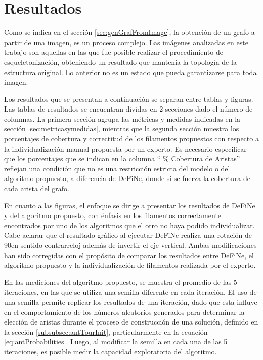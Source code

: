 \chapter{Resultados}
\label{chap:res}

Como se indica en el secci\'on \ref{sec:genGrafFromImage}, la obtenci\'on de un grafo a partir de una imagen, es un proceso complejo. Las im\'agenes analizadas en este trabajo son aquellas en las que fue posible realizar el procedimiento de esqueletonizaci\'on, obteniendo un resultado que manten\'ia la topolog\'ia de la estructura original. Lo anterior no es un estado que pueda garantizarse para toda imagen. 


Los resultados que se presentan a continuaci\'on se separan entre tablas y figuras. Las tablas de resultados se encuentran dividas en 2 secciones dado el n\'umero de columnas. La primera secci\'on agrupa las m\'etricas y medidas indicadas en la secci\'on \ref{sec:metricasymedidas}, mientras que la segunda secci\'on muestra los porcentajes de cobertura y correctitud de los filamentos propuestos con respecto a la individualizaci\'on manual propuesta por un experto. Es necesario especificar que los porcentajes que se indican en la columna `` \% Cobertura de Aristas'' reflejan una condici\'on que no es una restricci\'on estricta del modelo o del algoritmo propuesto, a diferencia de DeFiNe, donde si se fuerza la cobertura de cada arista del grafo.


En cuanto a las figuras, el enfoque se dirige a presentar los resultados de DeFiNe y del algoritmo propuesto, con \'enfasis en los filamentos correctamente encontrados por uno de los algoritmos que el otro no haya podido individualizar. Cabe aclarar que el resultado gr\'afico al ejecutar DeFiNe realiza una rotaci\'on de 90\textdegree en sentido contrarreloj adem\'as de invertir el eje vertical. Ambas modificaciones han sido corregidas con el prop\'osito de comparar los resultados entre DeFiNe, el algoritmo propuesto y la individualizaci\'on de filamentos realizada por el experto.


En las mediciones del algoritmo propuesto, se muestra el promedio de las 5 iteraciones, en las que se utiliza una semilla diferente en cada iteraci\'on. El uso de una semilla permite replicar los resultados de una iteraci\'on, dado que esta influye en el comportamiento de los n\'umeros aleatorios generados para determinar la elecci\'on de aristas durante el proceso de construcci\'on de una soluci\'on, definido en la secci\'on \ref{subsubsec:antTourInit}, particularmente en la ecuaci\'on \ref{eq:antProbabilities}. Luego, al modificar la semilla en cada una de las 5 iteraciones, es posible medir la capacidad exploratoria del algoritmo. 


